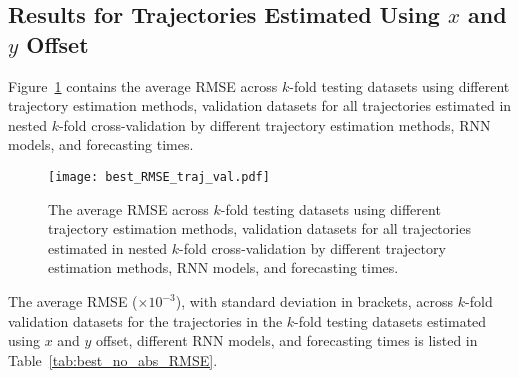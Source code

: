 \subsection{Results for Trajectories Estimated Using $x$ and $y$ Offset}

Figure~\ref{fig:best_RMSE_traj_val} contains the average RMSE across $k$-fold testing datasets using different trajectory estimation methods, validation datasets for all trajectories estimated in nested $k$-fold cross-validation by different trajectory estimation methods, RNN models, and forecasting times.

\begin{figure}[!ht]
	\centering
	\texttt{[image: best\_RMSE\_traj\_val.pdf]}
	\caption{The average RMSE across $k$-fold testing datasets using different trajectory estimation methods, validation datasets for all trajectories estimated in nested $k$-fold cross-validation by different trajectory estimation methods, RNN models, and forecasting times.}
	\label{fig:best_RMSE_traj_val}
\end{figure}

The average RMSE ($\times 10^{-3}$), with standard deviation in brackets, across $k$-fold validation datasets for the trajectories in the $k$-fold testing datasets estimated using $x$ and $y$ offset, different RNN models, and forecasting times is listed in Table~\ref{tab:best_no_abs_RMSE}.

\begin{table}[!ht]
	\centering
	\caption{The average RMSE ($\times 10^{-3}$), with standard deviation in brackets, across $k$-fold validation datasets for the trajectories in the $k$-fold testing datasets estimated using $x$ and $y$ offset, different RNN models, and forecasting times.}
	\label{tab:best_no_abs_RMSE}
\end{table}


